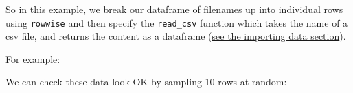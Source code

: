 \documentclass[]{article}
\newenvironment{Shaded}{\begin{snugshade}}{\end{snugshade}}
\newcommand{\KeywordTok}[1]{\textcolor[rgb]{0.13,0.29,0.53}{\textbf{#1}}}
\newcommand{\DataTypeTok}[1]{\textcolor[rgb]{0.13,0.29,0.53}{#1}}
\newcommand{\DecValTok}[1]{\textcolor[rgb]{0.00,0.00,0.81}{#1}}
\newcommand{\StringTok}[1]{\textcolor[rgb]{0.31,0.60,0.02}{#1}}
\newcommand{\CommentTok}[1]{\textcolor[rgb]{0.56,0.35,0.01}{\textit{#1}}}
\newcommand{\OperatorTok}[1]{\textcolor[rgb]{0.81,0.36,0.00}{\textbf{#1}}}
\newcommand{\NormalTok}[1]{#1}
\theoremstyle{definition}
\theoremstyle{definition}
\theoremstyle{definition}
\theoremstyle{remark}
\begin{document}
So in this example, we break our dataframe of filenames up into
individual rows using \texttt{rowwise} and then specify the
\texttt{read\_csv} function which takes the name of a csv file, and
returns the content as a dataframe
(\protect\hyperlink{importing-data}{see the importing data section}).

For example:

\begin{Shaded}
\end{Shaded}

We can check these data look OK by sampling 10 rows at random:

\begin{Shaded}
\end{Shaded}
\end{document}
